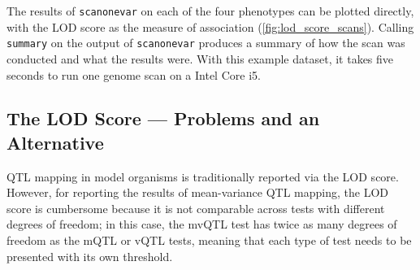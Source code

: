 \documentclass[9pt,twocolumn,twoside]{gsag3jnl}
\begin{document}
The results of \texttt{scanonevar} on each of the four phenotypes can be plotted directly, with the LOD score as the measure of association (\autoref{fig:lod_score_scans}).
Calling \texttt{summary} on the output of \texttt{scanonevar} produces a summary of how the scan was conducted and what the results were.
With this example dataset, it takes five seconds to run one genome scan on a Intel Core i5.



\subsection*{The LOD Score --- Problems and an Alternative}
QTL mapping in model organisms is traditionally reported via the LOD score. However, for reporting the results of mean-variance QTL mapping, the LOD score is cumbersome because it is not comparable across tests with different degrees of freedom; in this case, the mvQTL test has twice as many degrees of freedom as the mQTL or vQTL tests, meaning that each type of test needs to be presented with its own threshold.


\end{document}
